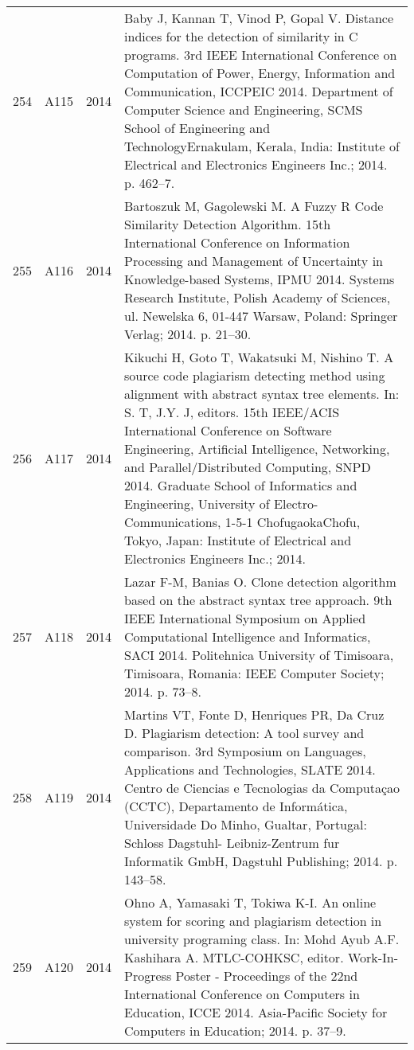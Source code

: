 \documentclass{article}\usepackage[]{graphicx}\usepackage[]{color}
\begin{document}
\begin{longtable}{l|L{1cm}|L{1cm}|L{12cm}|}
  254 & A115 & 2014 & Baby J, Kannan T, Vinod P, Gopal V. Distance indices for the detection of similarity in C programs. 3rd IEEE International Conference on Computation of Power, Energy, Information and Communication, ICCPEIC 2014. Department of Computer Science and Engineering, SCMS School of Engineering and TechnologyErnakulam, Kerala, India: Institute of Electrical and Electronics Engineers Inc.; 2014. p. 462–7. \\ 
  255 & A116 & 2014 & Bartoszuk M, Gagolewski M. A Fuzzy R Code Similarity Detection Algorithm. 15th International Conference on Information Processing and Management of Uncertainty in Knowledge-based Systems, IPMU 2014. Systems Research Institute, Polish Academy of Sciences, ul. Newelska 6, 01-447 Warsaw, Poland: Springer Verlag; 2014. p. 21–30. \\ 
  256 & A117 & 2014 & Kikuchi H, Goto T, Wakatsuki M, Nishino T. A source code plagiarism detecting method using alignment with abstract syntax tree elements. In: S. T, J.Y. J, editors. 15th IEEE/ACIS International Conference on Software Engineering, Artificial Intelligence, Networking, and Parallel/Distributed Computing, SNPD 2014. Graduate School of Informatics and Engineering, University of Electro-Communications, 1-5-1 ChofugaokaChofu, Tokyo, Japan: Institute of Electrical and Electronics Engineers Inc.; 2014. \\ 
  257 & A118 & 2014 & Lazar F-M, Banias O. Clone detection algorithm based on the abstract syntax tree approach. 9th IEEE International Symposium on Applied Computational Intelligence and Informatics, SACI 2014. Politehnica University of Timisoara, Timisoara, Romania: IEEE Computer Society; 2014. p. 73–8. \\ 
  258 & A119 & 2014 & Martins VT, Fonte D, Henriques PR, Da Cruz D. Plagiarism detection: A tool survey and comparison. 3rd Symposium on Languages, Applications and Technologies, SLATE 2014. Centro de Ciencias e Tecnologias da Computaçao (CCTC), Departamento de Informática, Universidade Do Minho, Gualtar, Portugal: Schloss Dagstuhl- Leibniz-Zentrum fur Informatik GmbH, Dagstuhl Publishing; 2014. p. 143–58. \\ 
  259 & A120 & 2014 & Ohno A, Yamasaki T, Tokiwa K-I. An online system for scoring and plagiarism detection in university programing class. In: Mohd Ayub A.F. Kashihara A. MTLC-COHKSC, editor. Work-In-Progress Poster - Proceedings of the 22nd International Conference on Computers in Education, ICCE 2014. Asia-Pacific Society for Computers in Education; 2014. p. 37–9. \\ 

\end{longtable}
\end{document}

